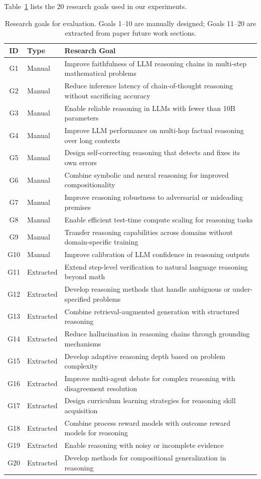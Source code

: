 Table~\ref{tab:goals} lists the 20 research goals used in our experiments.

\begin{table}[h]
\centering
\caption{Research goals for evaluation. Goals 1--10 are manually designed; Goals 11--20 are extracted from paper future work sections.}
\label{tab:goals}
\small
\begin{tabular}{@{}clp{9cm}@{}}
\toprule
\textbf{ID} & \textbf{Type} & \textbf{Research Goal} \\
\midrule
G1 & Manual & Improve faithfulness of LLM reasoning chains in multi-step mathematical problems \\
G2 & Manual & Reduce inference latency of chain-of-thought reasoning without sacrificing accuracy \\
G3 & Manual & Enable reliable reasoning in LLMs with fewer than 10B parameters \\
G4 & Manual & Improve LLM performance on multi-hop factual reasoning over long contexts \\
G5 & Manual & Design self-correcting reasoning that detects and fixes its own errors \\
G6 & Manual & Combine symbolic and neural reasoning for improved compositionality \\
G7 & Manual & Improve reasoning robustness to adversarial or misleading premises \\
G8 & Manual & Enable efficient test-time compute scaling for reasoning tasks \\
G9 & Manual & Transfer reasoning capabilities across domains without domain-specific training \\
G10 & Manual & Improve calibration of LLM confidence in reasoning outputs \\
G11 & Extracted & Extend step-level verification to natural language reasoning beyond math \\
G12 & Extracted & Develop reasoning methods that handle ambiguous or under-specified problems \\
G13 & Extracted & Combine retrieval-augmented generation with structured reasoning \\
G14 & Extracted & Reduce hallucination in reasoning chains through grounding mechanisms \\
G15 & Extracted & Develop adaptive reasoning depth based on problem complexity \\
G16 & Extracted & Improve multi-agent debate for complex reasoning with disagreement resolution \\
G17 & Extracted & Design curriculum learning strategies for reasoning skill acquisition \\
G18 & Extracted & Combine process reward models with outcome reward models for reasoning \\
G19 & Extracted & Enable reasoning with noisy or incomplete evidence \\
G20 & Extracted & Develop methods for compositional generalization in reasoning \\
\bottomrule
\end{tabular}
\end{table}

